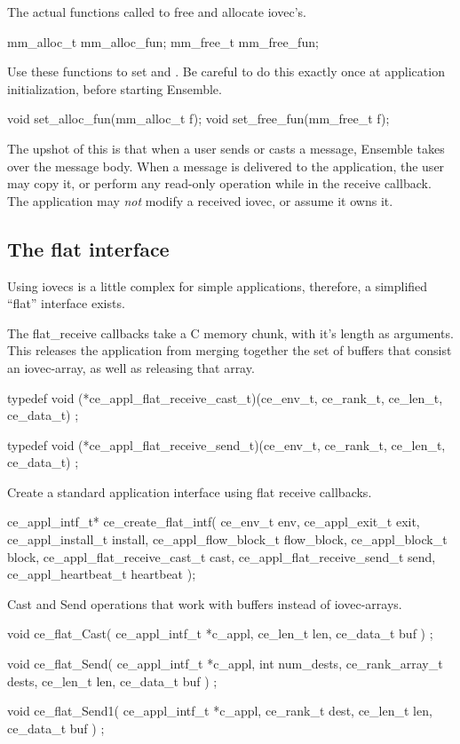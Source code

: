 The actual functions called to free and allocate iovec's.
\begin{codebox}
mm_alloc_t mm_alloc_fun;
mm_free_t mm_free_fun;
\end{codebox}

Use these functions to set  and . Be careful to
do this exactly once at application initialization, before
starting Ensemble.
\begin{codebox}
void set_alloc_fun(mm_alloc_t f);
void set_free_fun(mm_free_t f);
\end{codebox}

The upshot of this is that when a user sends or casts a message,
Ensemble takes over the message body. When a message is
delivered to the application, the user may copy it, or perform any
read-only operation while in the receive callback. The application may
{\it not} modify a received iovec, or assume it owns it.

\subsection{The flat interface}
Using iovecs is a little complex for simple applications,
therefore, a simplified ``flat'' interface exists.

The flat\_receive callbacks take a C memory chunk, with it's length as
arguments. This releases the application from merging together the
set of buffers that consist an iovec-array, as well as releasing that
array.
\begin{codebox}
typedef void (*ce_appl_flat_receive_cast_t)(ce_env_t, ce_rank_t, ce_len_t, ce_data_t) ;

typedef void (*ce_appl_flat_receive_send_t)(ce_env_t, ce_rank_t, ce_len_t, ce_data_t) ;
\end{codebox}


Create a standard application interface using flat receive callbacks.
\begin{codebox}
ce_appl_intf_t*
ce_create_flat_intf(
    ce_env_t env, 
    ce_appl_exit_t exit,
    ce_appl_install_t install,
    ce_appl_flow_block_t flow_block,
    ce_appl_block_t block,
    ce_appl_flat_receive_cast_t cast,
    ce_appl_flat_receive_send_t send,
    ce_appl_heartbeat_t heartbeat
);
\end{codebox}


Cast and Send operations that work with buffers instead of iovec-arrays.
\begin{codebox}
void ce_flat_Cast(
    ce_appl_intf_t *c_appl,
    ce_len_t len, 
    ce_data_t buf
) ;

void ce_flat_Send(
    ce_appl_intf_t *c_appl,
    int num_dests,
    ce_rank_array_t dests,
    ce_len_t len, 
    ce_data_t buf
) ;

void ce_flat_Send1(
    ce_appl_intf_t *c_appl,
    ce_rank_t dest,
    ce_len_t len, 
    ce_data_t buf
) ;
\end{codebox}



